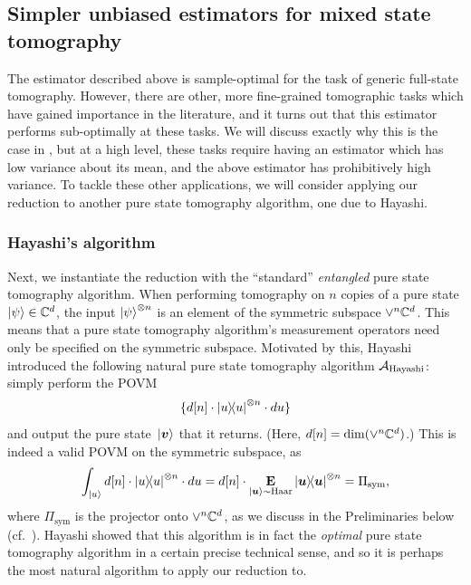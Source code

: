 \documentclass{article}
\newcommand{\hayashi}{\calA_{\mathrm{Hayashi}}}
\begin{document}
\subsection{Simpler unbiased estimators for mixed state tomography}

The estimator described above is sample-optimal for the task of generic full-state tomography.
However, there are other, more fine-grained tomographic tasks which have gained importance in the literature,
and it turns out that this estimator performs sub-optimally at these tasks.
We will discuss exactly why this is the case in ,
but at a high level, these tasks require having an estimator which has low variance about its mean, and the above estimator has prohibitively high variance.
To tackle these other applications, we will consider applying our reduction to another pure state tomography algorithm, one due to Hayashi.

\subsubsection{Hayashi's algorithm}
Next, we instantiate the reduction with the ``standard'' \emph{entangled} pure state tomography algorithm.
When performing tomography on $n$ copies of a pure state $\ket{\psi} \in \mathbb C^d$,
the input $\ket{\psi}^{\otimes n}$ is an element of the symmetric subspace $\lor^n \mathbb C^d$.
This means that a pure state tomography algorithm's measurement operators need only be specified on the symmetric subspace.
Motivated by this, Hayashi~\cite{Hay98} introduced the following natural pure state tomography algorithm $\hayashi$:
simply perform the POVM
\begin{equation}
    \{d[n] \cdot \ketbra{u}^{\otimes n} \cdot du\}
\end{equation}
and output the pure state $\ket*{\boldsymbol{v}}$ that it returns. (Here, $d[n] = \dim(\lor^n \mathbb C^d)$.)
This is indeed a valid POVM on the symmetric subspace, as
\begin{equation*}
    \int_{\ket{u}} d[n] \cdot \ketbra{u}^{\otimes n} \cdot du
    = d[n] \cdot \mathop{\bf E\/}_{\ket{\boldsymbol{u}} \sim \mathrm{Haar}} \ketbra{\boldsymbol{u}}^{\otimes n}
    = \Pi_{\mathrm{sym}},
\end{equation*}
where $\Pi_{\mathrm{sym}}$ is the projector onto $\lor^n \mathbb C^d$,
as we discuss in the Preliminaries below
(cf.\ ).
Hayashi showed that this algorithm is in fact the \emph{optimal} pure state tomography algorithm in a certain precise technical sense,
and so it is perhaps the most natural algorithm to apply our reduction to.
\end{document}
